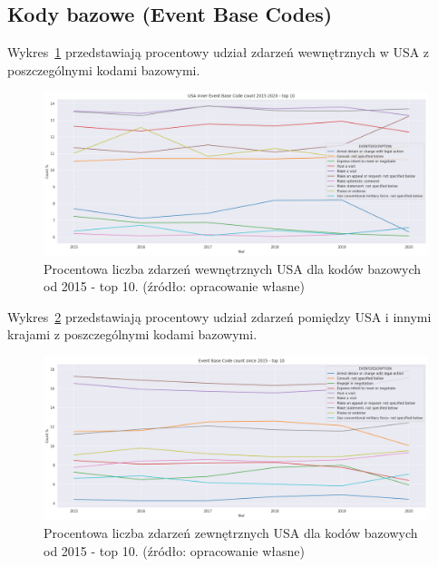 \documentclass[11pt]{report}
\begin{document}
    \subsection{Kody bazowe (Event Base Codes)}\label{subsec:kody-bazowenullevent-base-codesnull2}
    Wykres~\ref{fig:USA_inner_EBCperc} przedstawiają procentowy udział zdarzeń wewnętrznych w USA z poszczególnymi kodami bazowymi.
    \begin{figure}[!htp]
        \centering
        \includegraphics[width=\linewidth]{fig/USA inner/EBCperc.png}
        \caption{Procentowa liczba zdarzeń wewnętrznych USA dla kodów bazowych od 2015 - top 10. (źródło: opracowanie własne)}
        \label{fig:USA_inner_EBCperc}
    \end{figure}

    Wykres~\ref{fig:USA_not_inner_EBCperc} przedstawiają procentowy udział zdarzeń pomiędzy USA i innymi krajami z poszczególnymi kodami bazowymi.
    \begin{figure}[!htp]
        \centering
        \includegraphics[width=\linewidth]{fig/USA not inner/EBCperc.png}
        \caption{Procentowa liczba zdarzeń zewnętrznych USA dla kodów bazowych od 2015 - top 10. (źródło: opracowanie własne)}
        \label{fig:USA_not_inner_EBCperc}
    \end{figure}
\end{document}
